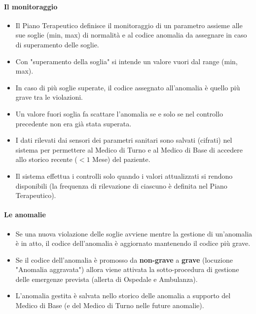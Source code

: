 \documentclass[a4paper,11pt,oneside, table]{article}
\begin{document}
\paragraph{Il monitoraggio}
\begin{itemize}
  \item Il Piano Terapeutico definisce il monitoraggio di un parametro assieme alle sue soglie (min, max) di normalit\`a e al codice anomalia da assegnare in caso di superamento delle soglie.
  \item Con "superamento della soglia" si intende un valore vuori dal range (min, max).
  \item In caso di pi\`u soglie superate, il codice assegnato all'anomalia \`e quello pi\`u grave tra le violazioni.
  \item Un valore fuori soglia fa scattare l'anomalia se e solo se nel controllo precedente non era gi\`a stata superata.
  \item I dati rilevati dai sensori dei parametri sanitari sono salvati (cifrati) nel sistema per permettere al Medico di Turno e al Medico di Base di accedere allo storico recente ($< 1$ Mese) del paziente.
  \item Il sistema effettua i controlli solo quando i valori attualizzati si rendono disponibili (la frequenza di rilevazione di ciascuno \`e definita nel Piano Terapeutico).
\end{itemize}

\paragraph{Le anomalie}
\begin{itemize}
  \item Se una nuova violazione delle soglie avviene mentre la gestione di un'anomalia \`e in atto, il codice dell'anomalia \`e aggiornato mantenendo il codice pi\`u grave.
  \item Se il codice dell'anomalia \`e promosso da \textbf{non-grave} a \textbf{grave} (locuzione "Anomalia aggravata") allora viene attivata la sotto-procedura di gestione delle emergenze prevista (allerta di Ospedale e Ambulanza).
  \item L'anomalia gestita \`e salvata nello storico delle anomalia a supporto del Medico di Base (e del Medico di Turno nelle future anomalie).
\end{itemize}
\end{document}
